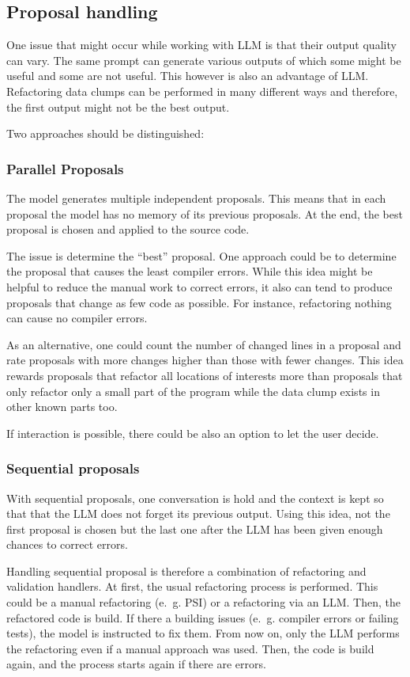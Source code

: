 \subsection{Proposal handling}

One issue that might occur while working with \ac{LLM} is that their output quality can vary. The same prompt can generate various outputs of which some might be useful and some are not useful. This however is also an advantage of \acs{LLM}. Refactoring data clumps can be performed in many different ways and therefore, the first output might not be the best output. 

Two approaches should be distinguished:
\subsubsection{Parallel Proposals}
The model generates multiple independent proposals. This means that in each proposal the model has no memory of its previous proposals. At the end, the best proposal is chosen and applied to the source code.

The issue is determine the \enquote{best} proposal. One approach could be to determine the proposal that causes the least compiler errors. While this idea might be helpful to reduce the manual work to correct errors, it also can tend to produce proposals that change as few code as possible. For instance, refactoring nothing can cause no compiler errors.

As an alternative, one could count the number of changed lines in a proposal and rate proposals with more changes higher than those with fewer changes. This idea rewards proposals that refactor all locations of interests more than proposals that only refactor only a small part of the program while the data clump exists in other known parts too. 


If interaction is possible, there could be also an option to let the user decide.
\subsubsection{Sequential proposals}

With sequential proposals, one conversation is hold and the context is kept so that that the \ac{LLM} does not forget its previous output. Using this idea, not the first proposal is chosen but the last one after the \ac{LLM} has been given enough chances to correct errors.

Handling sequential proposal is therefore a combination of refactoring and validation handlers. At first, the usual refactoring process is performed. This could be a manual refactoring (e.~g. PSI) or a refactoring via an \ac{LLM}. Then, the refactored code is build. If there a building issues (e.~g. compiler errors or failing tests), the model is instructed to fix them. From now on, only the \ac{LLM} performs the refactoring even if a manual approach was used. Then, the code is build again, and the process starts again if there are errors. 



